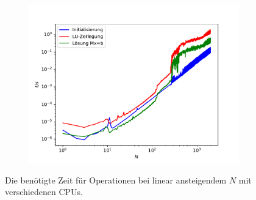 \documentclass{scrartcl}
\begin{document}
\begin{figure}[h]
\begin{subfigure}{0.4\textwidth}
		\includegraphics[width=\textwidth]{build/timers_lin_Prd.pdf}
		\end{subfigure}
		\caption{Die benötigte Zeit für Operationen bei linear ansteigendem $N$ mit verschiedenen CPUs.}
		\label{fig:time_lin}
		\end{figure}
\end{document}
